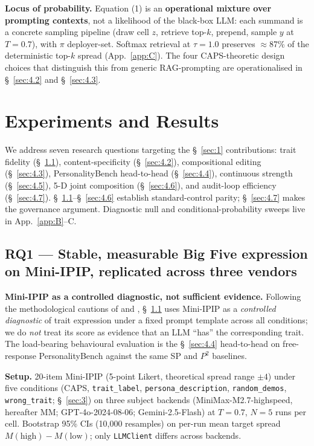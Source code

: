 \textbf{Locus of probability.} Equation (1) is an \textbf{operational mixture over prompting contexts}, not a likelihood of the black-box LLM: each summand is a concrete sampling pipeline (draw cell $z$, retrieve top-$k$, prepend, sample $y$ at $T=0.7$), with $\pi$ deployer-set. Softmax retrieval at $\tau = 1.0$ preserves $\approx$87\% of the deterministic top-$k$ spread (App.~\ref{app:C}). The four CAPS-theoretic design choices that distinguish this from generic RAG-prompting are operationalised in \S~\ref{sec:4.2} and \S~\ref{sec:4.3}.

\section{Experiments and Results}
\label{sec:4}

We address seven research questions targeting the \S~\ref{sec:1} contributions: trait fidelity (\S~\ref{sec:4.1}), content-specificity (\S~\ref{sec:4.2}), compositional editing (\S~\ref{sec:4.3}), PersonalityBench head-to-head (\S~\ref{sec:4.4}), continuous strength (\S~\ref{sec:4.5}), 5-D joint composition (\S~\ref{sec:4.6}), and audit-loop efficiency (\S~\ref{sec:4.7}). \S~\ref{sec:4.1}--\S~\ref{sec:4.6} establish standard-control parity; \S~\ref{sec:4.7} makes the governance argument. Diagnostic null and conditional-probability sweeps live in App.~\ref{app:B}--C.

\subsection{RQ1 --- Stable, measurable Big Five expression on Mini-IPIP, replicated across three vendors}
\label{sec:4.1}

\textbf{Mini-IPIP as a controlled diagnostic, not sufficient evidence.} Following the methodological cautions of \citet{serapio2023personality} and \citet{abdulhai2025consistent}, \S~\ref{sec:4.1} uses Mini-IPIP as a \textit{controlled diagnostic} of trait expression under a fixed prompt template across all conditions; we do \textit{not} treat its score as evidence that an LLM ``has'' the corresponding trait. The load-bearing behavioural evaluation is the \S~\ref{sec:4.4} head-to-head on free-response PersonalityBench against the same SP and $P^{\!2}$ baselines.

\textbf{Setup.} 20-item Mini-IPIP \cite{donnellan2006miniipip} (5-point Likert, theoretical spread range $\pm 4$) under five conditions (CAPS, \texttt{trait\_\allowbreak{}label}, \texttt{persona\_\allowbreak{}description}, \texttt{random\_\allowbreak{}demos}, \texttt{wrong\_\allowbreak{}trait}; \S~\ref{sec:3}) on three subject backends (MiniMax-M2.7-highspeed, hereafter MM; GPT-4o-2024-08-06; Gemini-2.5-Flash) at $T = 0.7$, $N = 5$ runs per cell. Bootstrap 95\% CIs (10,000 resamples) on per-run mean target spread $M(\text{high}) - M(\text{low})$; only \texttt{LLMClient} differs across backends.

